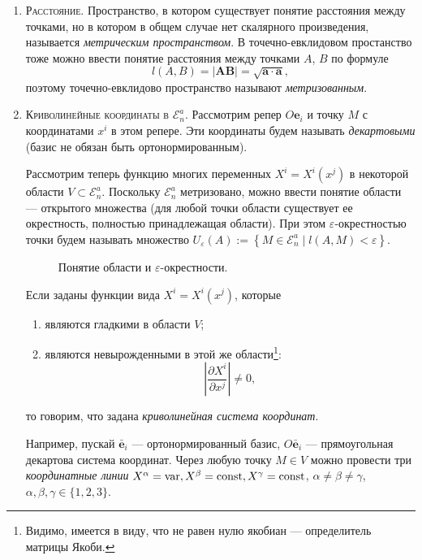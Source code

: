 \begin{enumerate}
  \item \textsc{Расстояние.} Пространство, в котором существует понятие
    расстояния между точками,
    но в котором в
    общем случае нет скалярного произведения, называется \emph{метрическим
    пространством}.
    В точечно-евклидовом простанство тоже можно ввести понятие расстояния между
    точками $A$, $B$ по формуле
    \[
      l(A, B) = |\mathbf{AB}| = \sqrt{\mathbf{a} \cdot \mathbf{a}},
    \]
    поэтому точечно-евклидово пространство называют \emph{метризованным}.

  \item \textsc{Криволинейные координаты в $\mathcal{E}_n^a$.} Рассмотрим репер
    $O\mathbf{e}_i$ и точку $M$ с
    координатами $x^i$ в этом репере. Эти координаты будем называть
    \emph{декартовыми} (базис не обязан быть ортонормированным).
    \begin{figure}[H]
    	\centering
    	
    \end{figure}
    Рассмотрим теперь функцию многих переменных $X^i = X^i (x^j)$ в некоторой области
    $V \subset \mathcal{E}_n^a$. Поскольку $\mathcal{E}_n^a$ метризовано, можно ввести понятие 
    области --- открытого множества (для любой точки области существует ее окрестность, полностью
    принадлежащая области). При этом $\varepsilon$-окрестностью точки будем называть множество
    $U_\varepsilon(A) := \left\{ M \in \mathcal{E}_n^a \mid l(A, M) < \varepsilon \right\} $.
    \begin{figure}[H]
    	\centering
    	
      \caption{Понятие области и $ \varepsilon $-окрестности.}
    \end{figure}
    
    Если заданы функции вида $X^i = X^i (x^j)$, которые
    \begin{enumerate}
      \item являются гладкими в области $V$;
      \item являются невырожденными в этой же области\footnote{Видимо, имеется в
        виду, что не равен нулю якобиан --- определитель матрицы Якоби.}:
        \[
          \left| \dfrac{\partial X^i}{\partial x^j} \right| \neq 0,
        \]
    \end{enumerate}
    то говорим, что задана \emph{криволинейная система координат}.
  
    Например, пускай $\bar{\mathbf{e}}_i$ --- ортонормированный базис,
    $O\bar{\mathbf{e}}_i$ --- прямоугольная
    декартова система координат. Через любую точку $M \in V$ можно провести три
    \emph{координатные линии}
    $X^\alpha = \mathrm{var}, X^{\beta} = \mathrm{const}, X^\gamma = \mathrm{const}$, $\alpha \neq \beta
    \neq \gamma$, $\alpha, \beta, \gamma \in \{1, 2, 3\}$.
    

\end{enumerate}
